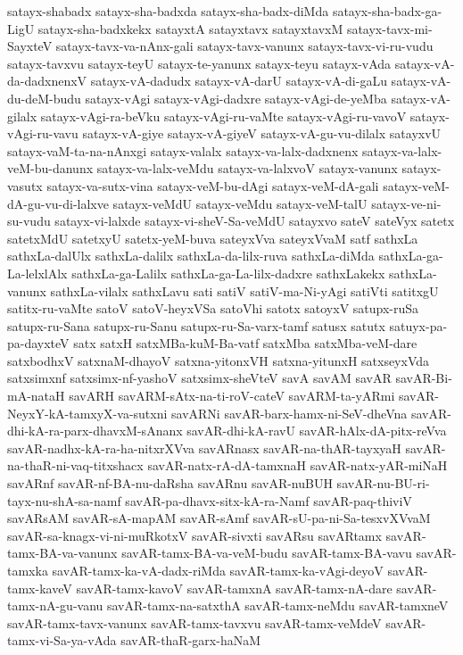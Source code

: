 {satayx-shabadx
satayx-sha-badxda
satayx-sha-badx-diMda
satayx-sha-badx-ga-LigU
satayx-sha-badxkekx
satayxtA
satayxtavx
satayxtavxM
satayx-tavx-mi-SayxteV
satayx-tavx-va-nAnx-gali
satayx-tavx-vanunx
satayx-tavx-vi-ru-vudu
satayx-tavxvu
satayx-teyU
satayx-te-yanunx
satayx-teyu
satayx-vAda
satayx-vA-da-dadxnenxV
satayx-vA-dadudx
satayx-vA-darU
satayx-vA-di-gaLu
satayx-vA-du-deM-budu
satayx-vAgi
satayx-vAgi-dadxre
satayx-vAgi-de-yeMba
satayx-vA-gilalx
satayx-vAgi-ra-beVku
satayx-vAgi-ru-vaMte
satayx-vAgi-ru-vavoV
satayx-vAgi-ru-vavu
satayx-vA-giye
satayx-vA-giyeV
satayx-vA-gu-vu-dilalx
satayxvU
satayx-vaM-ta-na-nAnxgi
satayx-valalx
satayx-va-lalx-dadxnenx
satayx-va-lalx-veM-bu-danunx
satayx-va-lalx-veMdu
satayx-va-lalxvoV
satayx-vanunx
satayx-vasutx
satayx-va-sutx-vina
satayx-veM-bu-dAgi
satayx-veM-dA-gali
satayx-veM-dA-gu-vu-di-lalxve
satayx-veMdU
satayx-veMdu
satayx-veM-talU
satayx-ve-ni-su-vudu
satayx-vi-lalxde
satayx-vi-sheV-Sa-veMdU
satayxvo
sateV
sateVyx
satetx
satetxMdU
satetxyU
satetx-yeM-buva
sateyxVva
sateyxVvaM
satf
sathxLa
sathxLa-dalUlx
sathxLa-dalilx
sathxLa-da-lilx-ruva
sathxLa-diMda
sathxLa-ga-La-lelxlAlx
sathxLa-ga-Lalilx
sathxLa-ga-La-lilx-dadxre
sathxLakekx
sathxLa-vanunx
sathxLa-vilalx
sathxLavu
sati
satiV
satiV-ma-Ni-yAgi
satiVti
satitxgU
satitx-ru-vaMte
satoV
satoV-heyxVSa
satoVhi
satotx
satoyxV
satupx-ruSa
satupx-ru-Sana
satupx-ru-Sanu
satupx-ru-Sa-varx-tamf
satusx
satutx
satuyx-pa-pa-dayxteV
satx
satxH
satxMBa-kuM-Ba-vatf
satxMba
satxMba-veM-dare
satxbodhxV
satxnaM-dhayoV
satxna-yitonxVH
satxna-yitunxH
satxseyxVda
satxsimxnf
satxsimx-nf-yashoV
satxsimx-sheVteV
savA
savAM
savAR
savAR-Bi-mA-nataH
savARH
savARM-sAtx-na-ti-roV-cateV
savARM-ta-yARmi
savAR-NeyxY-kA-tamxyX-va-sutxni
savARNi
savAR-barx-hamx-ni-SeV-dheVna
savAR-dhi-kA-ra-parx-dhavxM-sAnanx
savAR-dhi-kA-ravU
savAR-hAlx-dA-pitx-reVva
savAR-nadhx-kA-ra-ha-nitxrXVva
savARnasx
savAR-na-thAR-tayxyaH
savAR-na-thaR-ni-vaq-titxshacx
savAR-natx-rA-dA-tamxnaH
savAR-natx-yAR-miNaH
savARnf
savAR-nf-BA-nu-daRsha
savARnu
savAR-nuBUH
savAR-nu-BU-ri-tayx-nu-shA-sa-namf
savAR-pa-dhavx-sitx-kA-ra-Namf
savAR-paq-thiviV
savARsAM
savAR-sA-mapAM
savAR-sAmf
savAR-sU-pa-ni-Sa-tesxvXVvaM
savAR-sa-knagx-vi-ni-muRkotxV
savAR-sivxti
savARsu
savARtamx
savAR-tamx-BA-va-vanunx
savAR-tamx-BA-va-veM-budu
savAR-tamx-BA-vavu
savAR-tamxka
savAR-tamx-ka-vA-dadx-riMda
savAR-tamx-ka-vAgi-deyoV
savAR-tamx-kaveV
savAR-tamx-kavoV
savAR-tamxnA
savAR-tamx-nA-dare
savAR-tamx-nA-gu-vanu
savAR-tamx-na-satxthA
savAR-tamx-neMdu
savAR-tamxneV
savAR-tamx-tavx-vanunx
savAR-tamx-tavxvu
savAR-tamx-veMdeV
savAR-tamx-vi-Sa-ya-vAda
savAR-thaR-garx-haNaM
}
